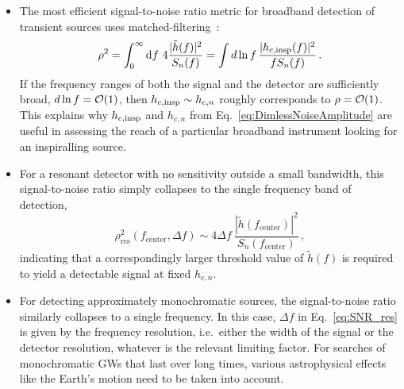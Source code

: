 \documentclass[11pt,a4paper]{article}
\begin{document}
\begin{itemize}
\item The most efficient signal-to-noise ratio metric for broadband detection of transient sources uses matched-filtering~\cite{Maggiore:1900zz,allen:2012findchirp,Moore:2014sen}:
\begin{equation}
    \rho^2 = \int_0^\infty \mathrm{d}f~  4 \frac{|\tilde{h}(f)|^2}{S_n(f)} = \int d \ln f \, \frac{|h_{c,\rm insp}(f)|^2}{f S_n(f)} \,.
\end{equation}
If the frequency ranges of both the signal and the detector are sufficiently broad, $d \ln f = {\cal O}(1)$, then $h_{c, \rm insp} \sim h_{c,n}$ roughly corresponds to $\rho = {\cal O}(1)$. This explains why $h_{c, \rm insp}$ and $h_{c,n}$ from Eq.~\ref{eq:DimlessNoiseAmplitude} are useful in assessing the reach of a particular broadband instrument looking for an inspiralling source.

\item For a resonant detector with no sensitivity outside a small bandwidth, this signal-to-noise ratio simply collapses to the single frequency band of detection,
\begin{equation}
    \rho^2_\mathrm{res}(f_\mathrm{center},\Delta f) \sim 4 \Delta f ~  \frac{|\tilde{h}(f_\mathrm{center})|^2}{S_n(f_\mathrm{center})} \,,
    \label{eq:SNR_res}
\end{equation}
indicating that a correspondingly larger threshold value of $\tilde h(f)$ is required to yield a detectable signal at fixed $h_{c,n}$.

\item For detecting approximately monochromatic sources, the signal-to-noise ratio similarly collapses to a single frequency. In this case, $\Delta f$ in Eq.~\eqref{eq:SNR_res} is given by the frequency resolution, i.e.\ either the width of the signal or the detector resolution, whatever is the relevant limiting factor. For searches of monochromatic GWs that last over long times, various astrophysical effects like the Earth's motion need to be taken into account.


\end{itemize}
\end{document}
